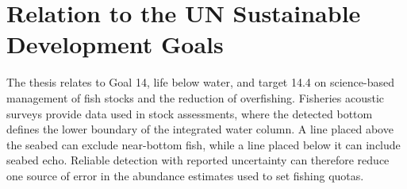 \section{Relation to the UN Sustainable Development Goals}

The thesis relates to Goal 14, life below water, and target 14.4 on science-based management of fish stocks and the reduction of overfishing. Fisheries acoustic surveys provide data used in stock assessments, where the detected bottom defines the lower boundary of the integrated water column. A line placed above the seabed can exclude near-bottom fish, while a line placed below it can include seabed echo. Reliable detection with reported uncertainty can therefore reduce one source of error in the abundance estimates used to set fishing quotas.
